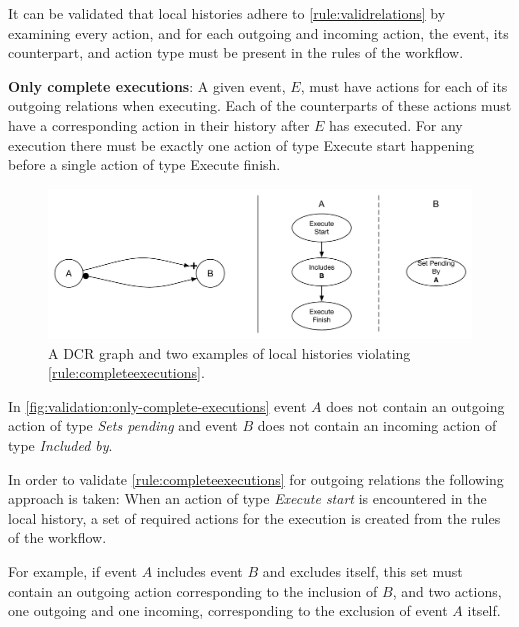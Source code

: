 	\noindent It can be validated that local histories adhere to \autoref{rule:validrelations} by examining every action, and for each outgoing and incoming action, the event, its counterpart, and action type must be present in the rules of the workflow.
	
	\begin{ruledef}
		\textbf{Only complete executions}: A given event, $E$, must have actions for each of its outgoing relations when executing. Each of the counterparts of these actions must have a corresponding action in their history after $E$ has executed. For any execution there must be exactly one action of type \textup{Execute start} happening before a single action of type \textup{Execute finish}.
		\label{rule:completeexecutions}
	\end{ruledef}

	\begin{figure}[H]
		\centering
		\includegraphics[width=\textwidth]{5validation/images/only-complete-executions.pdf}
		\caption{A DCR graph and two examples of local histories violating \autoref{rule:completeexecutions}.}
		\label{fig:validation:only-complete-executions}
	\end{figure}

	\noindent In \autoref{fig:validation:only-complete-executions} event $A$ does not contain an outgoing action of type \textit{Sets pending} and event $B$ does not contain an incoming action of type \textit{Included by}.

	\newpar In order to validate \autoref{rule:completeexecutions} for outgoing relations the following approach is taken: When an action of type \textit{Execute start} is encountered in the local history, a set of required actions for the execution is created from the rules of the workflow.
	
	For example, if event $A$ includes event $B$ and excludes itself, this set must contain an outgoing action corresponding to the inclusion of $B$, and two actions, one outgoing and one incoming, corresponding to the exclusion of event $A$ itself.
	
